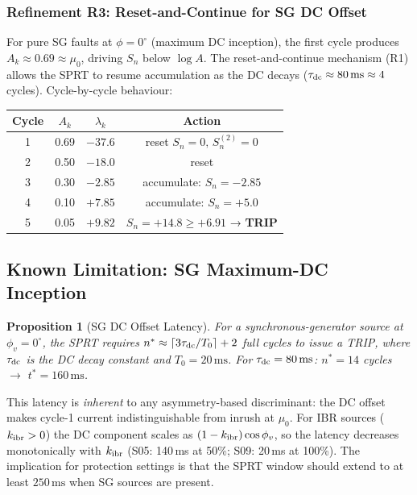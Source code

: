 \documentclass[11pt, a4paper]{article}
\newtheorem{proposition}{Proposition}
\newcommand{\Ak}{A_k}
\newcommand{\Sn}{S_n}
\newcommand{\logA}{\log A}
\newcommand{\ms}{\,\text{ms}}
\begin{document}
\subsubsection*{Refinement R3: Reset-and-Continue for SG DC Offset}

For pure SG faults at $\phi = 0^\circ$ (maximum DC inception), the first
cycle produces $\Ak \approx 0.69 \approx \mu_0$, driving $\Sn$ below $\logA$.
The reset-and-continue mechanism (R1) allows the SPRT to resume accumulation
as the DC decays ($\tau_{\rm dc} \approx 80\ms \approx 4$ cycles).
Cycle-by-cycle behaviour:

\begin{center}
\renewcommand{\arraystretch}{1.05}
\begin{tabular}{cccc}
\toprule
Cycle & $A_k$ & $\lambda_k$ & Action \\
\midrule
1 & 0.69 & $-37.6$ & reset $\Sn\!=\!0,\,\Sn^{(2)}\!=\!0$ \\
2 & 0.50 & $-18.0$ & reset \\
3 & 0.30 & $-2.85$ & accumulate: $\Sn = -2.85$ \\
4 & 0.10 & $+7.85$ & accumulate: $\Sn = +5.0$ \\
5 & 0.05 & $+9.82$ & $\Sn = +14.8 \geq +6.91$ → \textbf{TRIP} \\
\bottomrule
\end{tabular}
\end{center}

\subsection{Known Limitation: SG Maximum-DC Inception}

\begin{proposition}[SG DC Offset Latency]
\label{prop:sg_dc_latency}
For a synchronous-generator source at $\phi_v = 0^\circ$, the SPRT requires
$n^* \approx \lceil 3\tau_{\rm dc}/T_0 \rceil + 2$ full cycles to issue a
TRIP, where $\tau_{\rm dc}$ is the DC decay constant and $T_0 = 20\ms$.
For $\tau_{\rm dc} = 80\ms$: $n^* = 14$ cycles $\to$ $t^* = 160\ms$.
\end{proposition}

This latency is \emph{inherent} to any asymmetry-based discriminant: the
DC offset makes cycle-1 current indistinguishable from inrush at $\mu_0$.
For IBR sources ($k_{\rm ibr} > 0$) the DC component scales as
$(1-k_{\rm ibr})\cos\phi_v$, so the latency decreases monotonically with
$k_{\rm ibr}$ (S05: 140\,ms at 50\%; S09: 20\,ms at 100\%).
The implication for protection settings is that the SPRT window should
extend to at least $250\ms$ when SG sources are present.
\end{document}
